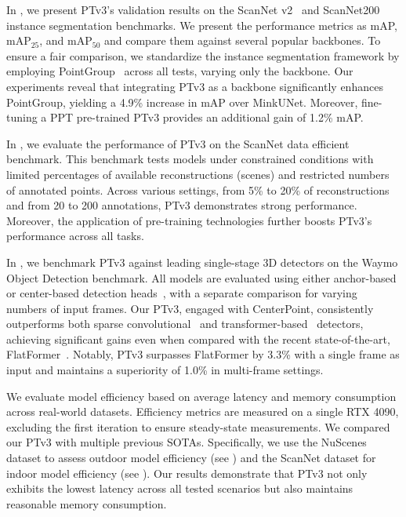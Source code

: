 In , we present PTv3's validation results on the ScanNet v2~\cite{dai2017scannet} and ScanNet200~\cite{rozenberszki2022language} instance segmentation benchmarks. We present the performance metrics as mAP, mAP$_{25}$, and mAP$_{50}$ and compare them against several popular backbones. To ensure a fair comparison, we standardize the instance segmentation framework by employing PointGroup~\cite{jiang2020pointgroup} across all tests, varying only the backbone. Our experiments reveal that integrating PTv3 as a backbone significantly enhances PointGroup, yielding a 4.9\% increase in mAP over MinkUNet. Moreover, fine-tuning a PPT pre-trained PTv3 provides an additional gain of 1.2\% mAP.

 In , we evaluate the performance of PTv3 on the ScanNet data efficient~\cite{hou2021exploring} benchmark. This benchmark tests models under constrained conditions with limited percentages of available reconstructions (scenes) and restricted numbers of annotated points. Across various settings, from 5\% to 20\% of reconstructions and from 20 to 200 annotations, PTv3 demonstrates strong performance. Moreover, the application of pre-training technologies further boosts PTv3's performance across all tasks.

In , we benchmark PTv3 against leading single-stage 3D detectors on the Waymo Object Detection benchmark. All models are evaluated using either anchor-based or center-based detection heads~\cite{yan2018second, yin2021center}, with a separate comparison for varying numbers of input frames. Our PTv3, engaged with CenterPoint, consistently outperforms both sparse convolutional~\cite{shi2022pillarnet, yin2021center} and transformer-based~\cite{fan2022embracing, he2022voxset} detectors, achieving significant gains even when compared with the recent state-of-the-art, FlatFormer~\cite{liu2023flatformer}. Notably, PTv3 surpasses FlatFormer by 3.3\% with a single frame as input and maintains a superiority of 1.0\% in multi-frame settings.


 We evaluate model efficiency based on average latency and memory consumption across real-world datasets. Efficiency metrics are measured on a single RTX 4090, excluding the first iteration to ensure steady-state measurements. We compared our PTv3 with multiple previous SOTAs. Specifically, we use the NuScenes dataset to assess outdoor model efficiency (see ) and the ScanNet dataset for indoor model efficiency (see ). Our results demonstrate that PTv3 not only exhibits the lowest latency across all tested scenarios but also maintains reasonable memory consumption.

